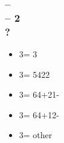 \documentclass[12pt, a4paper]{article}
\begin{document}



\subsubsection*{ --  \\ 
                 -- 2\nt\\
                ?}
\begin{itemize}
    \item 3\clubs = 3
    \item 3\diams = 5422
    \item 3\hearts = 64+21-
    \item 3\spades = 64+12-
    \item 3\nt = other
\end{itemize}

\end{document}
